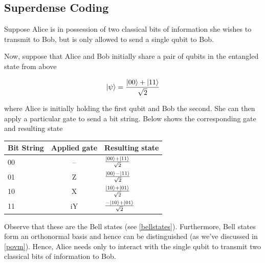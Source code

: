 \documentclass[11pt]{article}
\newcommand\0{\mathbf{0}}
\newcommand\<{\langle}
\renewcommand\>{\rangle}
\begin{document}
\subsection{Superdense Coding}

Suppose Alice is in possession of two classical bits of information she wishes to transmit to Bob, but is only allowed to send a single qubit to Bob.

 Now, suppose that Alice and Bob initially share a pair of qubits in the entangled state from above
 
\begin{align*}
\ket{\psi} = \frac{\ket{00} + \ket{11}}{\sqrt{2}}	
\end{align*}
 
 where Alice is initially holding the first qubit and Bob the second. She can then apply a particular gate to send a bit string. Below shows the corresponding gate and resulting state
 
 \begin{table}[H]
 	\begin{center}
 \begin{tabular}{l | c | l }
 	Bit String & Applied gate  & Resulting state\\
 	\hline 
 	00 & -- & $\frac{\ket{00} + \ket{11}}{\sqrt{2}}$\\
 	01 & Z & $\frac{\ket{00} - \ket{11}}{\sqrt{2}}$\\
 	10 & X & $\frac{\ket{10} + \ket{01}}{\sqrt{2}}$\\
 	11 & iY & $\frac{-\ket{10} + \ket{01}}{\sqrt{2}}$
 \end{tabular}
 \end{center}
 \end{table}

Observe that these are the Bell states (see \ref{bellstates}). Furthermore, Bell states form an orthonormal basis and hence can be distinguished (as we've discussed in \ref{povm}). Hence, Alice needs only to interact with the single qubit to transmit two classical bits of information to Bob.
\end{document}
